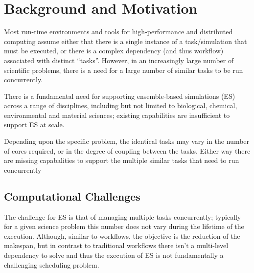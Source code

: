 \documentclass{sig-alternate}
\begin{document}
 

\section{Background and Motivation} 


Most run-time environments and tools for high-performance and
distributed computing assume either that there is a single instance of
a task/simulation that must be executed, or there is a complex
dependency (and thus workflow) associated with distinct ``tasks''.
However, in an increasingly large number of scientific problems, there
is a need for a large number of similar tasks to be run concurrently.

There is a fundamental need for supporting ensemble-based simulations
(ES) across a range of disciplines, including but not limited to
biological, chemical, environmental and material sciences; existing
capabilities are insufficient to support ES at scale. 

Depending upon the specific problem, the identical tasks may vary in
the number of cores required, or in the degree of coupling between the
tasks.  Either way there are missing capabalities to support the
multiple similar tasks that need to run concurrently



\subsection{Computational Challenges}

The challenge for ES is that of managing multiple tasks concurrently;
typically for a given science problem this number does not vary during
the lifetime of the execution. Although, similar to workflows, the
objective is the reduction of the makespan, but in contrast to
traditional workflows there isn't a multi-level dependency to solve
and thus the execution of ES is not fundamentally a challenging
scheduling problem.
\end{document}
